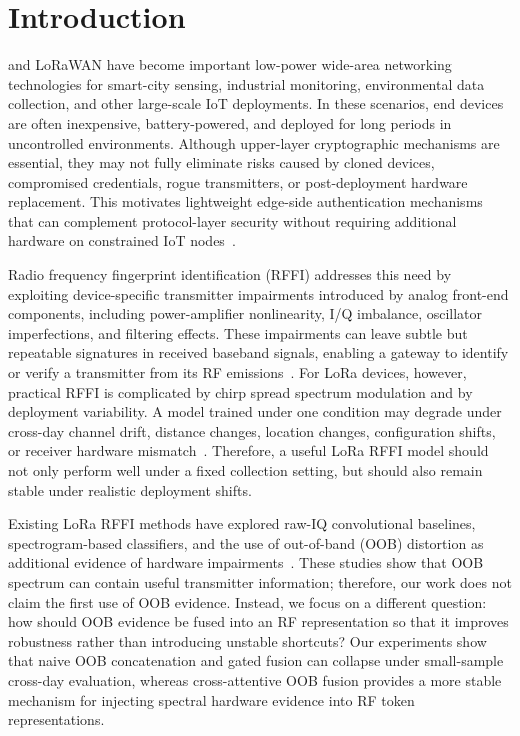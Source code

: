 \section{Introduction}

 and LoRaWAN have become important low-power wide-area networking technologies for smart-city sensing, industrial monitoring, environmental data collection, and other large-scale IoT deployments.
In these scenarios, end devices are often inexpensive, battery-powered, and deployed for long periods in uncontrolled environments.
Although upper-layer cryptographic mechanisms are essential, they may not fully eliminate risks caused by cloned devices, compromised credentials, rogue transmitters, or post-deployment hardware replacement.
This motivates lightweight edge-side authentication mechanisms that can complement protocol-layer security without requiring additional hardware on constrained IoT nodes~\cite{lorawan_spec,hamdaoui2022deeplearning}.

Radio frequency fingerprint identification (RFFI) addresses this need by exploiting device-specific transmitter impairments introduced by analog front-end components, including power-amplifier nonlinearity, I/Q imbalance, oscillator imperfections, and filtering effects.
These impairments can leave subtle but repeatable signatures in received baseband signals, enabling a gateway to identify or verify a transmitter from its RF emissions~\cite{brik2008wireless_device_id,jian2020deeplearning_rf_fingerprinting}.
For LoRa devices, however, practical RFFI is complicated by chirp spread spectrum modulation and by deployment variability.
A model trained under one condition may degrade under cross-day channel drift, distance changes, location changes, configuration shifts, or receiver hardware mismatch~\cite{elmaghbub2021lora_wild,hamdaoui2022deeplearning}.
Therefore, a useful LoRa RFFI model should not only perform well under a fixed collection setting, but should also remain stable under realistic deployment shifts.

Existing LoRa RFFI methods have explored raw-IQ convolutional baselines, spectrogram-based classifiers, and the use of out-of-band (OOB) distortion as additional evidence of hardware impairments~\cite{shen2021lora_spectrogram_cnn,elmaghbub2020widescan,hamdaoui2022deeplearning}.
These studies show that OOB spectrum can contain useful transmitter information; therefore, our work does not claim the first use of OOB evidence.
Instead, we focus on a different question: how should OOB evidence be fused into an RF representation so that it improves robustness rather than introducing unstable shortcuts?
Our experiments show that naive OOB concatenation and gated fusion can collapse under small-sample cross-day evaluation, whereas cross-attentive OOB fusion provides a more stable mechanism for injecting spectral hardware evidence into RF token representations.

